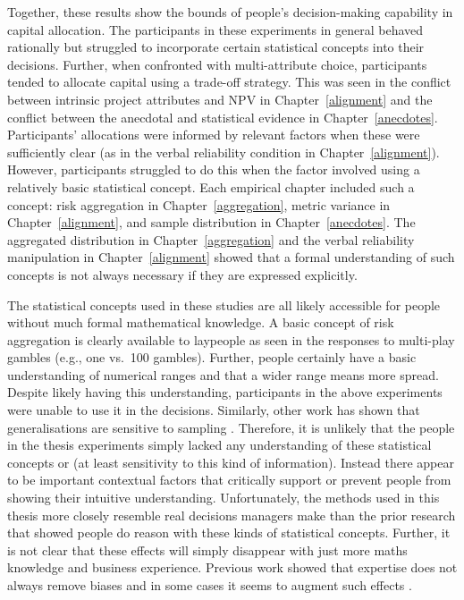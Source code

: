 \documentclass[a4paper, nobind]{templates/ociamthesis}
\theoremstyle{definition}
\theoremstyle{definition}
\theoremstyle{definition}
\theoremstyle{definition}
\theoremstyle{remark}
\begin{document}
Together, these results show the bounds of people's decision-making capability
in capital allocation. The participants in these experiments in general behaved
rationally but struggled to incorporate certain statistical concepts into their
decisions. Further, when confronted with multi-attribute choice, participants
tended to allocate capital using a trade-off strategy. This was seen in the
conflict between intrinsic project attributes and NPV in
Chapter~\ref{alignment} and the conflict between the anecdotal and statistical
evidence in Chapter~\ref{anecdotes}. Participants' allocations were informed by
relevant factors when these were sufficiently clear (as in the verbal
reliability condition in Chapter~\ref{alignment}). However, participants
struggled to do this when the factor involved using a relatively basic
statistical concept. Each empirical chapter included such a concept: risk
aggregation in Chapter~\ref{aggregation}, metric variance in
Chapter~\ref{alignment}, and sample distribution in Chapter~\ref{anecdotes}.
The aggregated distribution in Chapter~\ref{aggregation} and the verbal
reliability manipulation in Chapter~\ref{alignment} showed that a formal
understanding of such concepts is not always necessary if they are expressed
explicitly.

The statistical concepts used in these studies are all likely accessible for
people without much formal mathematical knowledge. A basic concept of risk
aggregation is clearly available to laypeople as seen in the responses to
multi-play gambles (e.g., one vs.~100 gambles). Further, people certainly have a
basic understanding of numerical ranges and that a wider range means more
spread. Despite likely having this understanding, participants in the above
experiments were unable to use it in the decisions. Similarly, other work has
shown that generalisations are sensitive to sampling \autocite{carvalho2021}. Therefore,
it is unlikely that the people in the thesis experiments simply lacked any
understanding of these statistical concepts or (at least sensitivity to this
kind of information). Instead there appear to be important contextual factors
that critically support or prevent people from showing their intuitive
understanding. Unfortunately, the methods used in this thesis more closely
resemble real decisions managers make than the prior research that showed people
do reason with these kinds of statistical concepts. Further, it is not clear
that these effects will simply disappear with just more maths knowledge and
business experience. Previous work showed that expertise does not always remove
biases and in some cases it seems to augment such effects \autocite[e.g.,][]{haigh2005}.
\end{document}
